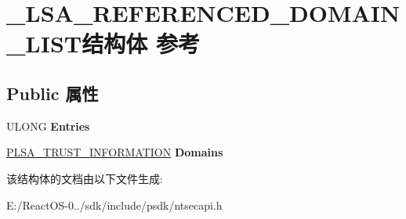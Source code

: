 \hypertarget{struct___l_s_a___r_e_f_e_r_e_n_c_e_d___d_o_m_a_i_n___l_i_s_t}{}\section{\+\_\+\+L\+S\+A\+\_\+\+R\+E\+F\+E\+R\+E\+N\+C\+E\+D\+\_\+\+D\+O\+M\+A\+I\+N\+\_\+\+L\+I\+S\+T结构体 参考}
\label{struct___l_s_a___r_e_f_e_r_e_n_c_e_d___d_o_m_a_i_n___l_i_s_t}
\subsection*{Public 属性}
\begin{DoxyCompactItemize}
\item 
\mbox{\label{struct___l_s_a___r_e_f_e_r_e_n_c_e_d___d_o_m_a_i_n___l_i_s_t_a00cdd0ec582606cad85ec5423bdb490c}} 
U\+L\+O\+NG {\bfseries Entries}
\item 
\mbox{\label{struct___l_s_a___r_e_f_e_r_e_n_c_e_d___d_o_m_a_i_n___l_i_s_t_a3a20dbd5b069a06e7b387521a369ef7e}} 
\hyperlink{struct___l_s_a___t_r_u_s_t___i_n_f_o_r_m_a_t_i_o_n}{P\+L\+S\+A\+\_\+\+T\+R\+U\+S\+T\+\_\+\+I\+N\+F\+O\+R\+M\+A\+T\+I\+ON} {\bfseries Domains}
\end{DoxyCompactItemize}


该结构体的文档由以下文件生成\+:\begin{DoxyCompactItemize}
\item 
E\+:/\+React\+O\+S-\/0../sdk/include/psdk/ntsecapi.\+h\end{DoxyCompactItemize}
